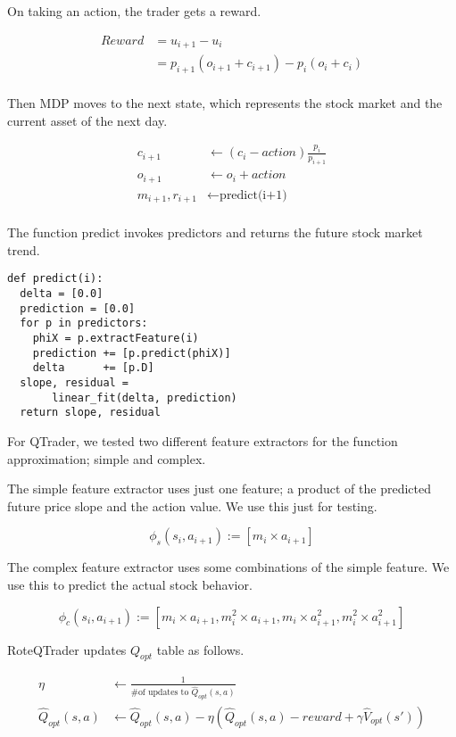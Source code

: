 \documentclass[twocolumn,10pt]{asme2ej}
\begin{document}
On taking an action, the trader gets a reward.

\begin{align*}
  Reward &= u_{i+1} - u_{i} \\
  &=p_{i+1}(o_{i+1} + c_{i+1}) - p_{i}(o_{i} + c_{i}) \\
\end{align*}

Then MDP moves to the next state, which represents the stock market and the current asset of the next day.

\begin{align*}
  c_{i+1} &\gets (c_{i} - action)\frac{p_i}{p_{i+1}} \\
  o_{i+1} &\gets o_{i} + action \\
  m_{i+1}, r_{i+1} &\gets \text{predict(i+1)} \\
\end{align*}

The function predict invokes predictors and returns the future stock market trend.

\begin{verbatim}
def predict(i):
  delta = [0.0]
  prediction = [0.0]
  for p in predictors:
    phiX = p.extractFeature(i)
    prediction += [p.predict(phiX)]
    delta      += [p.D]
  slope, residual = 
       linear_fit(delta, prediction)
  return slope, residual
\end{verbatim}

For QTrader, we tested two different feature extractors for the function approximation; simple and complex.

The simple feature extractor uses just one feature; a product of the predicted
future price slope and the action value. We use this just for testing.

\[
\phi_s(s_i,a_{i+1}) := [m_i \times a_{i+1}]
\]

The complex feature extractor uses some combinations of the simple feature. We
use this to predict the actual stock behavior.

\[
\phi_c(s_i,a_{i+1}) := [m_i \times a_{i+1}, m_i^2 \times a_{i+1}, m_i \times a_{i+1}^2, m_i^2 \times a_{i+1}^2 ]
\]

RoteQTrader updates $Q_{opt}$ table as follows.

\begin{align*}
  \eta &\gets \frac{1}{\text{\# of updates to }\hat{Q}_{opt}(s, a)} \\
  \hat{Q}_{opt}(s, a)&\gets \hat{Q}_{opt}(s, a) - \eta\left(\hat{Q}_{opt}(s, a) - reward + \gamma \hat{V}_{opt}(s')\right)
\end{align*}
\end{document}
